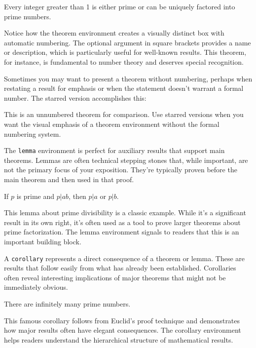 \documentclass[9pt]{amsart}
\begin{document}
\begin{theorem}
    Every integer greater than 1 is either prime or can be uniquely factored into prime numbers.
\end{theorem}

Notice how the theorem environment creates a visually distinct box with
automatic numbering. The optional argument in square brackets provides a name
or description, which is particularly useful for well-known results. This
theorem, for instance, is fundamental to number theory and deserves special
recognition.

Sometimes you may want to present a theorem without numbering, perhaps when
restating a result for emphasis or when the statement doesn't warrant a formal
number. The starred version accomplishes this:

\begin{theorem*}
    This is an unnumbered theorem for comparison. Use starred versions when you want the visual emphasis of a theorem environment without the formal numbering system.
\end{theorem*}

The \texttt{lemma} environment is perfect for auxiliary results that support
main theorems. Lemmas are often technical stepping stones that, while
important, are not the primary focus of your exposition. They're typically
proven before the main theorem and then used in that proof.

\begin{lemma}
    If $p$ is prime and $p | ab$, then $p | a$ or $p | b$.
\end{lemma}

This lemma about prime divisibility is a classic example. While it's a
significant result in its own right, it's often used as a tool to prove larger
theorems about prime factorization. The lemma environment signals to readers
that this is an important building block.

A \texttt{corollary} represents a direct consequence of a theorem or lemma.
These are results that follow easily from what has already been established.
Corollaries often reveal interesting implications of major theorems that might
not be immediately obvious.

\begin{corollary}
    There are infinitely many prime numbers.
\end{corollary}

This famous corollary follows from Euclid's proof technique and demonstrates
how major results often have elegant consequences. The corollary environment
helps readers understand the hierarchical structure of mathematical results.
\end{document}
